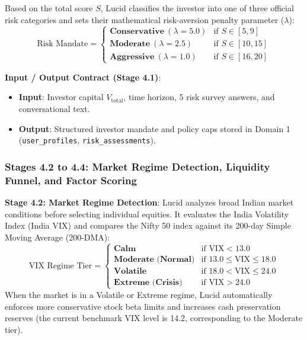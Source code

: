 Based on the total score $S$, Lucid classifies the investor into one of three official risk categories and sets their mathematical risk-aversion penalty parameter ($\lambda$):
\begin{equation}
\text{Risk Mandate} = 
\begin{cases} 
\textbf{Conservative} \ (\lambda = 5.0) & \text{if } S \in [5, 9] \\ 
\textbf{Moderate} \ (\lambda = 2.5) & \text{if } S \in [10, 15] \\ 
\textbf{Aggressive} \ (\lambda = 1.0) & \text{if } S \in [16, 20] 
\end{cases}
\end{equation}

\noindent \textbf{Input / Output Contract (Stage 4.1)}:
\begin{itemize}
    \item \textbf{Input}: Investor capital $V_{\text{total}}$, time horizon, 5 risk survey answers, and conversational text.
    \item \textbf{Output}: Structured investor mandate and policy caps stored in Domain 1 (\texttt{user\_profiles}, \texttt{risk\_assessments}).
\end{itemize}

\subsubsection{Stages 4.2 to 4.4: Market Regime Detection, Liquidity Funnel, and Factor Scoring}

\noindent \textbf{Stage 4.2: Market Regime Detection}:
Lucid analyzes broad Indian market conditions before selecting individual equities. It evaluates the India Volatility Index (India VIX) and compares the Nifty 50 index against its 200-day Simple Moving Average (200-DMA):
\begin{equation}
\text{VIX Regime Tier} = 
\begin{cases}
\textbf{Calm} & \text{if } \text{VIX} < 13.0 \\
\textbf{Moderate (Normal)} & \text{if } 13.0 \le \text{VIX} \le 18.0 \\
\textbf{Volatile} & \text{if } 18.0 < \text{VIX} \le 24.0 \\
\textbf{Extreme (Crisis)} & \text{if } \text{VIX} > 24.0
\end{cases}
\end{equation}
When the market is in a Volatile or Extreme regime, Lucid automatically enforces more conservative stock beta limits and increases cash preservation reserves (the current benchmark VIX level is 14.2, corresponding to the Moderate tier).

